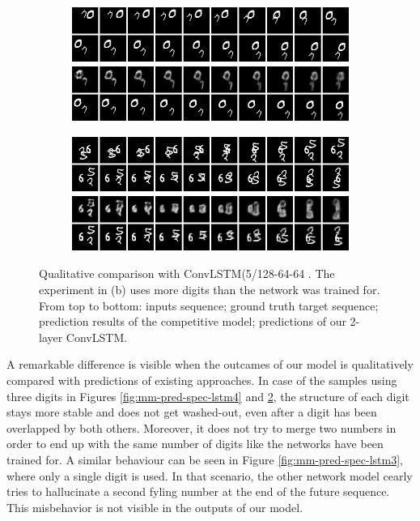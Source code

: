 \begin{figure}[h!tb]
\centering
\begin{subfigure}{0.49\textwidth}
  \centering
  \includegraphics[width=0.92\linewidth]{figures/pred/mm/spec/prediction-04.png}
  \caption{}
  \label{fig:mm-pred-spec2-clstm1}
\end{subfigure}%
\begin{subfigure}{0.49\textwidth}
  \centering
  \includegraphics[width=0.92\linewidth]{figures/pred/mm/spec/prediction-05.png}
  \caption{}
  \label{fig:mm-pred-spec2-clstm2}
\end{subfigure}
\caption[Comparison with other ConvLSTM on Moving MNIST]{Qualitative comparison with ConvLSTM(5/128-64-64 \parencite{conv_lstm_nowcasting}. The experiment in (b) uses more digits than the network was trained for. From top to bottom: inputs sequence; ground truth target sequence; prediction results of the competitive model; predictions of our 2-layer ConvLSTM.} \label{fig:mm-pred-spec2-clstm}
\end{figure}

A remarkable difference is visible when the outcames of our model is qualitatively compared with predictions of existing approaches. In case of the samples using three digits in Figures \ref{fig:mm-pred-spec-lstm4} and \ref{fig:mm-pred-spec2-clstm2}, the structure of each digit stays more stable and does not get washed-out, even after a digit has been overlapped by both others. Moreover, it does not try to merge two numbers in order to end up with the same number of digits like the networks have been trained for. A similar behaviour can be seen in Figure \ref{fig:mm-pred-spec-lstm3}, where only a single digit is used. In that scenario, the other network model cearly tries to hallucinate a second fyling number at the end of the future sequence. This misbehavior is not visible in the outputs of our model.

